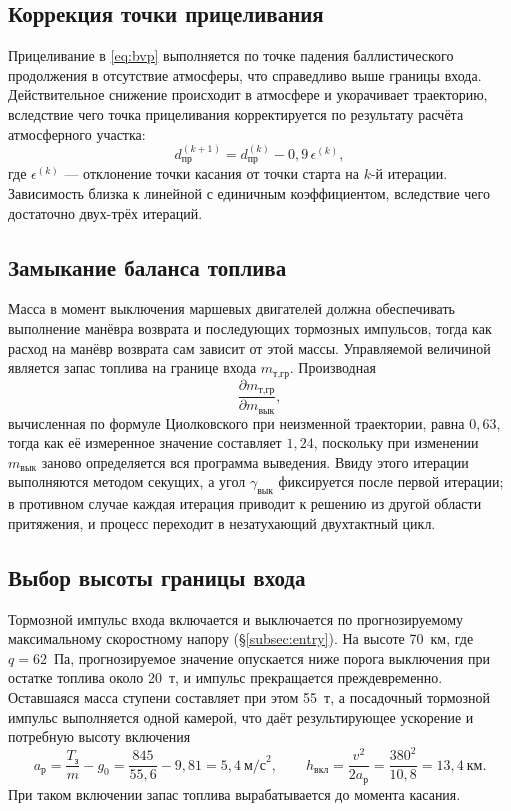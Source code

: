\documentclass[11pt,a4paper]{article}
\begin{document}
\subsection{Коррекция точки прицеливания}

Прицеливание в \eqref{eq:bvp} выполняется по точке падения баллистического
продолжения в отсутствие атмосферы, что справедливо выше границы входа.
Действительное снижение происходит в атмосфере и укорачивает траекторию,
вследствие чего точка прицеливания корректируется по результату расчёта
атмосферного участка:
\begin{equation}
d_{\text{пр}}^{(k+1)} = d_{\text{пр}}^{(k)} - 0{,}9\,\epsilon^{(k)},
\end{equation}
где $\epsilon^{(k)}$ — отклонение точки касания от точки старта на $k$-й
итерации. Зависимость близка к линейной с единичным коэффициентом, вследствие
чего достаточно двух-трёх итераций.

\subsection{Замыкание баланса топлива}

Масса в момент выключения маршевых двигателей должна обеспечивать выполнение
манёвра возврата и последующих тормозных импульсов, тогда как расход на манёвр
возврата сам зависит от этой массы. Управляемой величиной является запас топлива
на границе входа $m_{\text{т,гр}}$. Производная
\begin{equation}
\frac{\partial m_{\text{т,гр}}}{\partial m_{\text{вык}}},
\end{equation}
вычисленная по формуле Циолковского при неизменной траектории, равна $0{,}63$,
тогда как её измеренное значение составляет $1{,}24$, поскольку при изменении
$m_{\text{вык}}$ заново определяется вся программа выведения. Ввиду этого
итерации выполняются методом секущих, а угол $\gamma_{\text{вык}}$ фиксируется
после первой итерации; в противном случае каждая итерация приводит к решению из
другой области притяжения, и процесс переходит в незатухающий двухтактный цикл.

\subsection{Выбор высоты границы входа}
\label{subsec:gr}

Тормозной импульс входа включается и выключается по прогнозируемому
максимальному скоростному напору (\S\ref{subsec:entry}). На высоте 70~км, где
$q=62$~Па, прогнозируемое значение опускается ниже порога выключения при остатке
топлива около 20~т, и импульс прекращается преждевременно. Оставшаяся масса
ступени составляет при этом 55~т, а посадочный тормозной импульс выполняется
одной камерой, что даёт результирующее ускорение и потребную высоту включения
\begin{equation}
a_{\text{р}} = \frac{T_{\text{з}}}{m} - g_0
 = \frac{845}{55{,}6} - 9{,}81 = 5{,}4\ \text{м/с}^2,
\qquad
h_{\text{вкл}} = \frac{v^2}{2a_{\text{р}}} = \frac{380^2}{10{,}8}
 = 13{,}4\ \text{км}.
\end{equation}
При таком включении запас топлива вырабатывается до момента касания.
\end{document}
